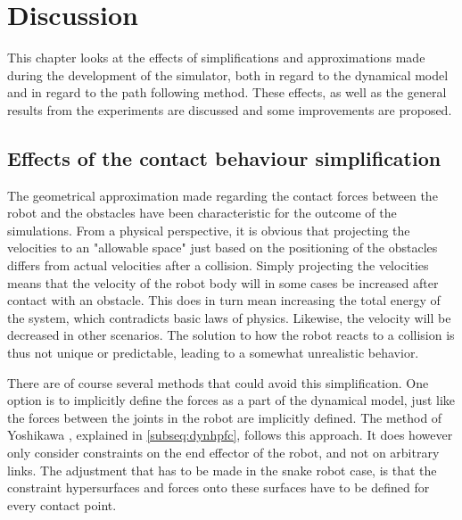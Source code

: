 \chapter{Discussion} \label{ch:discussion}

This chapter looks at the effects of simplifications and approximations made during the development of the simulator, both in regard to the dynamical model and in regard to the path following method. These effects, as well as the general results from the experiments are discussed and some improvements are proposed.

\section{Effects of the contact behaviour simplification}

The geometrical approximation made regarding the contact forces between the robot and the obstacles have been characteristic for the outcome of the simulations.
From a physical perspective, it is obvious that projecting the velocities to an "allowable space" just based on the positioning of the obstacles differs from actual velocities after a collision. Simply projecting the velocities means that the velocity of the robot body will in some cases be increased after contact with an obstacle. This does in turn mean increasing the total energy of the system, which contradicts basic laws of physics. Likewise, the velocity will be decreased in other scenarios. The solution to how the robot reacts to a collision is thus not unique or predictable, leading to a somewhat unrealistic behavior.

There are of course several methods that could avoid this simplification.
One option is to implicitly define the forces as a part of the dynamical model, just like the forces between the joints in the robot are implicitly defined. The method of Yoshikawa \cite{yoshikawa1987dynamic}, explained in \ref{subseq:dynhpfc}, follows this approach. It does however only consider constraints on the end effector of the robot, and not on arbitrary links. The adjustment that has to be made in the snake robot case, is that the constraint hypersurfaces and forces onto these surfaces have to be defined for every contact point.


